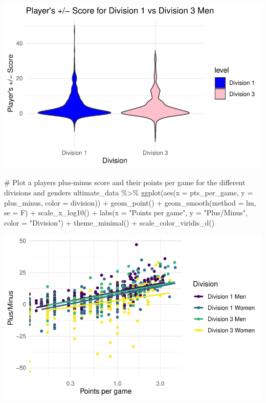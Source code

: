 \documentclass[
  letterpaper,
  DIV=11,
  numbers=noendperiod]{scrartcl}
\newenvironment{Shaded}{\begin{snugshade}}{\end{snugshade}}
\newcommand{\AttributeTok}[1]{\textcolor[rgb]{0.40,0.45,0.13}{#1}}
\newcommand{\CommentTok}[1]{\textcolor[rgb]{0.37,0.37,0.37}{#1}}
\newcommand{\FunctionTok}[1]{\textcolor[rgb]{0.28,0.35,0.67}{#1}}
\newcommand{\NormalTok}[1]{\textcolor[rgb]{0.00,0.23,0.31}{#1}}
\newcommand{\SpecialCharTok}[1]{\textcolor[rgb]{0.37,0.37,0.37}{#1}}
\newcommand{\StringTok}[1]{\textcolor[rgb]{0.13,0.47,0.30}{#1}}
\begin{document}
\includegraphics{final_eda_files/figure-pdf/division-level-&-plus-minus-3.pdf}

\begin{Shaded}
\begin{Highlighting}[]
\CommentTok{\# Plot a player\textquotesingle{}s plus{-}minus score and their points per game for the different divisions and genders}
\NormalTok{ultimate\_data }\SpecialCharTok{\%\textgreater{}\%} \FunctionTok{ggplot}\NormalTok{(}\FunctionTok{aes}\NormalTok{(}\AttributeTok{x =}\NormalTok{ pts\_per\_game, }\AttributeTok{y =}\NormalTok{ plus\_minus, }\AttributeTok{color =}\NormalTok{ division)) }\SpecialCharTok{+} 
   \FunctionTok{geom\_point}\NormalTok{() }\SpecialCharTok{+} \FunctionTok{geom\_smooth}\NormalTok{(}\AttributeTok{method =} \StringTok{\textquotesingle{}lm\textquotesingle{}}\NormalTok{, }\AttributeTok{se =}\NormalTok{ F) }\SpecialCharTok{+} \FunctionTok{scale\_x\_log10}\NormalTok{() }\SpecialCharTok{+}
  \FunctionTok{labs}\NormalTok{(}\AttributeTok{x =} \StringTok{"Points per game"}\NormalTok{, }\AttributeTok{y =} \StringTok{"Plus/Minus"}\NormalTok{, }\AttributeTok{color =} \StringTok{"Division"}\NormalTok{) }\SpecialCharTok{+} 
  \FunctionTok{theme\_minimal}\NormalTok{() }\SpecialCharTok{+}
  \FunctionTok{scale\_color\_viridis\_d}\NormalTok{()}
\end{Highlighting}
\end{Shaded}

\includegraphics{final_eda_files/figure-pdf/plus-minus-&-other-variable-1.pdf}
\end{document}
